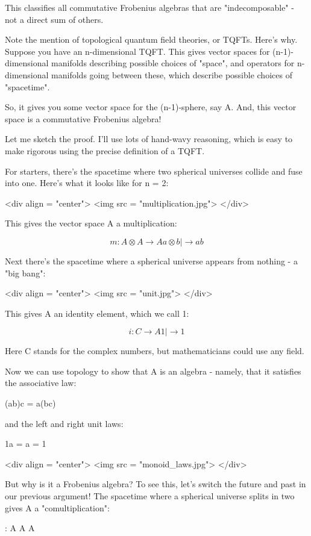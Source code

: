 This classifies all commutative Frobenius algebras that are
"indecomposable" - not a direct sum of others.

Note the mention of topological quantum field theories, or TQFTs.
Here's why.  Suppose you have an n-dimensional TQFT.  This gives
vector spaces for (n-1)-dimensional manifolds describing possible
choices of "space", and operators for n-dimensional
manifolds going between these, which describe possible choices of
"spacetime".

So, it gives you some vector space for the (n-1)-sphere, say A.  
And, this vector space is a commutative Frobenius algebra!  

Let me sketch the proof.  I'll use lots of hand-wavy reasoning,
which is easy to make rigorous using the precise definition of
a TQFT.  

For starters, there's the spacetime where two spherical universes 
collide and fuse into one.  Here's what it looks like for n = 2:

<div align = "center">
<img src = "multiplication.jpg">
</div>

This gives the vector space A a multiplication: 


$$

m: A \otimes  A  \to  A
   a \otimes  b |\to  ab
$$
    
Next there's the spacetime where a spherical universe appears 
from nothing - a "big bang":

<div align = "center">
<img src = "unit.jpg">
</div>

This gives A an identity element, which we call 1:


$$

i: C  \to  A
   1 |\to  1
$$
    
Here C stands for the complex numbers, but mathematicians could
use any field. 

Now we can use topology to show that A is an algebra - namely, 
that it satisfies the associative law:

(ab)c = a(bc) 

and the left and right unit laws: 

1a = a = 1

<div align = "center">
<img src = "monoid_laws.jpg">
</div>

But why is it a Frobenius algebra?  To see this, let's switch the 
future and past in our previous argument!  The spacetime where 
a spherical universe splits in two gives A a "comultiplication":

\Delta : A \to  A \otimes  A

